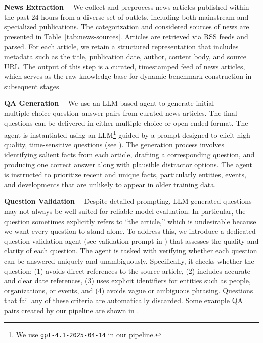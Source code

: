 \documentclass[11pt]{article}
\begin{document}
\textbf{News Extraction} \ \
We collect and preprocess news articles published within the past 24 hours from a diverse set of outlets, including both mainstream and specialized publications. The categorization and considered sources of news are presented in Table~\ref{tab:news-sources}. Articles are retrieved via RSS feeds and parsed. For each article, we retain a structured representation that includes metadata such as the title, publication date, author, content body, and source URL.
The output of this step is a curated, timestamped feed of news articles, which serves as the raw knowledge base for dynamic benchmark construction in subsequent stages.

\textbf{QA Generation}  \ \
We use an LLM‑based agent to generate initial multiple‑choice question–answer pairs from curated news articles. The final questions can be delivered in either multiple‑choice or open‑ended format. The agent is instantiated using an LLM\footnote{We use \texttt{gpt-4.1-2025-04-14} in our pipeline.} guided by a prompt designed to elicit high-quality, time-sensitive questions (see ). The generation process involves identifying salient facts from each article, drafting a corresponding question, and producing one correct answer along with plausible distractor options. The agent is instructed to prioritize recent and unique facts, particularly entities, events, and developments that are unlikely to appear in older training data. 

\textbf{Question Validation} \ \ 
Despite detailed prompting, LLM-generated questions may not always be well suited for reliable model evaluation. 
In particular, the question sometimes explicitly refers to ``the article,” which is undesirable because we want every question to stand alone.
To address this, we introduce a dedicated question validation agent (see validation prompt in ) that assesses the quality and clarity of each question. The agent is tasked with verifying whether each question can be answered uniquely and unambiguously. 
Specifically, it checks whether the question: (1) avoids direct references to the source article, (2) includes accurate and clear date references, (3) uses explicit identifiers for entities such as people, organizations, or events, and (4) avoids vague or ambiguous phrasing. Questions that fail any of these criteria are automatically discarded. Some example QA pairs created by our pipeline are shown in .
\end{document}
